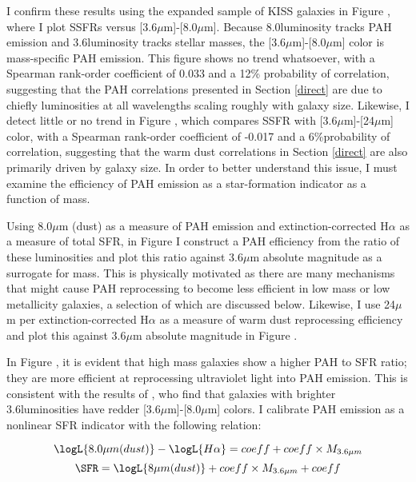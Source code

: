 I confirm these results using the expanded sample of KISS galaxies in Figure , where I plot SSFRs versus [3.6$\mu$m]-[8.0$\mu$m].  Because 8.0\micron luminosity tracks PAH emission and 3.6\micron luminosity tracks stellar masses, the [3.6$\mu$m]-[8.0$\mu$m] color is mass-specific PAH emission. This figure shows no trend whatsoever, with a Spearman rank-order coefficient of 0.033 and a 12\% probability of correlation, suggesting that the PAH correlations presented in Section \ref{direct} are due to chiefly luminosities at all wavelengths scaling roughly with galaxy size. Likewise, I detect little or no trend in Figure , which compares SSFR with [3.6$\mu$m]-[24$\mu$m] color, with a Spearman rank-order coefficient of -0.017 and a 6\%probability of correlation, suggesting that the warm dust correlations in Section \ref{direct} are also primarily driven by galaxy size. In order to better understand this issue, I must examine the efficiency of PAH emission as a star-formation indicator as a function of mass.

Using 8.0$\mu$m (dust) as a measure of PAH emission and extinction-corrected H$\alpha$ as a measure of total SFR, in Figure  I construct a PAH efficiency from the ratio of these luminosities and plot this ratio against 3.6$\mu$m absolute magnitude as a surrogate for mass. This is physically motivated as there are many mechanisms that might cause PAH reprocessing to become less efficient in low mass or low metallicity galaxies, a selection of which are discussed below. Likewise, I use 24$\mu$m per extinction-corrected H$\alpha$ as a measure of warm dust reprocessing efficiency and plot this against 3.6$\mu$m absolute magnitude in Figure .

In Figure , it is evident that high mass galaxies show a higher PAH to SFR ratio; they are more efficient at reprocessing ultraviolet light into PAH emission. This is consistent with the results of \cite{Hong}, who find that galaxies with brighter 3.6\micron luminosities have redder [3.6$\mu$m]-[8.0$\mu$m] colors. I calibrate PAH emission as a nonlinear SFR indicator with the following relation:

\begin{equation}
\logL{8.0\mu m(dust)}-\logL{H\alpha} = \fit{pah_sfr_36micron}{ada} + \fit{pah_sfr_36micron}{bdb}\times M_{3.6\mu m}\\
\end{equation}
\begin{equation}
\SFR = \logL{8\mu m(dust)}+\fit{sfr_pah_36micron}{bdb}\times M_{3.6\mu m} + \fit{sfr_pah_36micron}{ada}
\end{equation}

